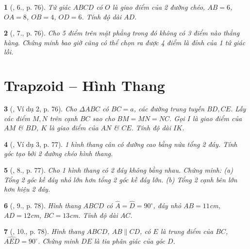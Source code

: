 \documentclass{article}
\newtheorem{baitoan}{}
\begin{document}
\begin{baitoan}[\cite{Binh_Toan_8_tap_1}, 6., p. 76]
	Tứ giác $ABCD$ có $O$ là giao điểm của 2 đường chéo, $AB = 6$, $OA = 8$, $OB = 4$, $OD = 6$. Tính độ dài $AD$.
\end{baitoan}

\begin{baitoan}[\cite{Binh_Toan_8_tap_1}, 7., p. 76]
	Cho 5 điểm trên mặt phẳng trong đó không có 3 điểm nào thẳng hàng. Chứng minh bao giờ cũng có thể chọn ra được 4 điểm là đỉnh của 1 tứ giác lồi.
\end{baitoan}


\section{Trapzoid -- Hình Thang}

\begin{baitoan}[\cite{Binh_Toan_8_tap_1}, Ví dụ 2, p. 76]
	Cho $\Delta ABC$ có $BC = a$, các đường trung tuyến $BD,CE$. Lấy các điểm $M,N$ trên cạnh $BC$ sao cho $BM = MN = NC$. Gọi $I$ là giao điểm của $AM$ \& $BD$, $K$ là giao điểm của $AN$ \& $CE$. Tính độ dài $IK$.
\end{baitoan}

\begin{baitoan}[\cite{Binh_Toan_8_tap_1}, Ví dụ 3, p. 77]
	1 hình thang cân có đường cao bằng nửa tổng 2 đáy. Tính góc tạo bởi 2 đường chéo hình thang.
\end{baitoan}

\begin{baitoan}[\cite{Binh_Toan_8_tap_1}, 8., p. 77]
	Cho 1 hình thang có 2 đáy không bằng nhau. Chứng minh: (a) Tổng 2 góc kề đáy nhỏ lớn hơn tổng 2 góc kề đáy lớn. (b) Tổng 2 cạnh bên lớn hơn hiệu 2 đáy.
\end{baitoan}

\begin{baitoan}[\cite{Binh_Toan_8_tap_1}, 9., p. 78]
	Hình thang $ABCD$ có $\widehat{A} = \widehat{D} = 90^\circ$, đáy nhỏ $AB = 11${\rm cm}, $AD = 12${\rm cm}, $BC = 13${\rm cm}. Tính độ dài $AC$.
\end{baitoan}

\begin{baitoan}[\cite{Binh_Toan_8_tap_1}, 10., p. 78]
	Hình thang $ABCD$, $AB\parallel CD$, có $E$ là trung điểm của $BC$, $\widehat{AED} = 90^\circ$. Chứng minh $DE$ là tia phân giác của góc $D$.
\end{baitoan}
\end{document}
